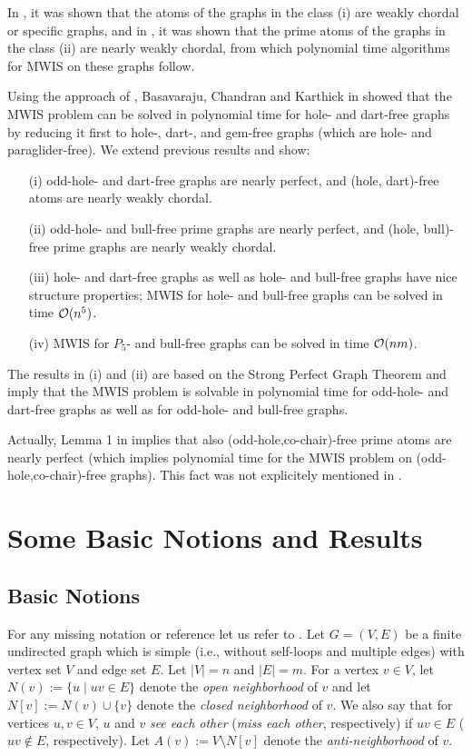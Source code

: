 \documentclass[11pt]{article}
\newcommand{\0}{\text{ has a co-join to }}
\newcommand{\1}{\text{ has a join to }}
\begin{document}
In \cite{BraGiaMaf2012}, it was shown that the atoms of the graphs in the class (i) are weakly chordal or specific graphs, and in \cite{BraGia2012}, 
it was shown that the prime atoms of the graphs in the class (ii) are nearly weakly chordal, from which polynomial time algorithms for MWIS on these graphs follow.  

Using the approach of \cite{BraGia2012,BraGiaMaf2012}, Basavaraju, Chandran and Karthick in \cite{BasChaKar2012} showed that the MWIS problem can be solved in polynomial time for hole- and dart-free graphs by reducing it first to hole-, dart-, and gem-free graphs (which are hole- and paraglider-free). We extend previous results and show:
\begin{itemize}
\item[(i)] odd-hole- and dart-free graphs are nearly perfect, and (hole, dart)-free atoms are nearly weakly chordal. 
\item[(ii)] odd-hole- and bull-free prime graphs are nearly perfect, and (hole, bull)-free prime graphs are nearly weakly chordal. 
\item[(iii)] hole- and dart-free graphs as well as hole- and bull-free graphs have nice structure properties; MWIS for hole- and bull-free graphs can be solved in time ${\cal O}(n^5)$. 
\item[(iv)] MWIS for $P_5$- and bull-free graphs can be solved in time ${\cal O}(n m)$. 
\end{itemize}

The results in (i) and (ii) are based on the Strong Perfect Graph Theorem and imply that the MWIS problem is solvable in polynomial time for odd-hole- and dart-free graphs as well as for odd-hole- and bull-free graphs. 

Actually, Lemma 1 in \cite{BraGia2012} implies that also (odd-hole,co-chair)-free prime atoms are nearly perfect (which implies polynomial time for the MWIS problem on (odd-hole,co-chair)-free graphs). This fact was not explicitely mentioned in \cite{BraGia2012}. 

\section{Some Basic Notions and Results}  

\subsection{Basic Notions}  

For any missing notation or reference let us refer to \cite{BraLeSpi1999}. Let $G = (V,E)$ be a finite undirected graph which is simple (i.e., without self-loops and multiple edges) with vertex set $V$ and edge set $E$. 
Let $|V|=n$ and $|E|=m$. 
For a vertex $v \in V$, let $N(v):=\{u \mid uv \in E\}$ denote the {\em open neighborhood} of $v$ and let $N[v]:=N(v) \cup \{v\}$ denote the {\em closed neighborhood} of $v$. We also say that for vertices $u,v \in V$, $u$ and $v$ {\em see each other} ({\em miss each other}, respectively) if $uv \in E$ ($uv \notin E$, respectively). 
Let $A(v):=V \setminus N[v]$ denote the {\em anti-neighborhood} of $v$.  
\end{document}
